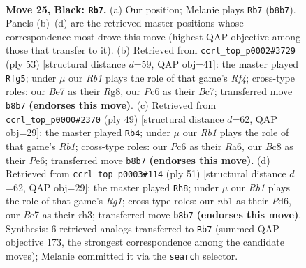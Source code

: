 \documentclass[11pt]{article}
\begin{document}
\clearpage

\begin{figure}[p]\centering
\begin{subfigure}{0.46\textwidth}\centering
\resizebox{\linewidth}{!}{%
\newchessgame
\chessboard[
  setfen={1rb1k3/p1p1bp1r/2p3p1/P1P4p/1P3P1P/2B5/7R/RN2K3 b Q - 6 25},
  showmover=false,
  pgfstyle=straightmove, color=movearrow, markmove={b8-b7}
]}
\caption{}
\end{subfigure}\hfill
\begin{subfigure}{0.46\textwidth}\centering
\resizebox{\linewidth}{!}{%
\newchessgame
\chessboard[
  setfen={2k3r1/1pb2p2/p3pp2/5r2/R1PP3p/2B2P1P/1P4P1/3R1K2 b - - 0 27},
  showmover=false,
  pgfstyle=straightmove, color=movearrow, markmove={f5-g5}
]}
\caption{}
\end{subfigure}
\\[4pt]
\begin{subfigure}{0.46\textwidth}\centering
\resizebox{\linewidth}{!}{%
\newchessgame
\chessboard[
  setfen={1r4k1/5p1p/r1p1p3/4b1P1/p3P3/1P2B3/P1P4P/1K1R3R b - - 3 25},
  showmover=false,
  pgfstyle=straightmove, color=movearrow, markmove={b8-b4}
]}
\caption{}
\end{subfigure}\hfill
\begin{subfigure}{0.46\textwidth}\centering
\resizebox{\linewidth}{!}{%
\newchessgame
\chessboard[
  setfen={4k1r1/4pp2/1r1p1b1p/p2P4/Pp6/5P1R/1PP3P1/1K1R1B2 b - - 0 26},
  showmover=false,
  pgfstyle=straightmove, color=movearrow, markmove={g8-h8}
]}
\caption{}
\end{subfigure}
\caption{\textbf{Move 25, Black: \texttt{Rb7}.} (a) Our position; Melanie plays \texttt{Rb7} (\texttt{b8b7}). Panels (b)--(d) are the retrieved master positions whose correspondence most drove this move (highest QAP objective among those that transfer to it). (b) Retrieved from \texttt{ccrl\_top\_p0002\#3729} (ply 53) [structural distance $d$=59, QAP obj=41]: the master played \texttt{Rfg5}; under $\mu$ our \emph{Rb1} plays the role of that game's \emph{Rf4}; cross-type roles: our \emph{B}e7 as their \emph{R}g8, our \emph{P}c6 as their \emph{B}c7; transferred move \texttt{b8b7} \textbf{(endorses this move)}. (c) Retrieved from \texttt{ccrl\_top\_p0000\#2370} (ply 49) [structural distance $d$=62, QAP obj=29]: the master played \texttt{Rb4}; under $\mu$ our \emph{Rb1} plays the role of that game's \emph{Rb1}; cross-type roles: our \emph{P}c6 as their \emph{R}a6, our \emph{B}c8 as their \emph{P}e6; transferred move \texttt{b8b7} \textbf{(endorses this move)}. (d) Retrieved from \texttt{ccrl\_top\_p0003\#114} (ply 51) [structural distance $d$=62, QAP obj=29]: the master played \texttt{Rh8}; under $\mu$ our \emph{Rb1} plays the role of that game's \emph{Rg1}; cross-type roles: our \emph{n}b1 as their \emph{P}d6, our \emph{B}e7 as their \emph{r}h3; transferred move \texttt{b8b7} \textbf{(endorses this move)}. Synthesis: 6 retrieved analogs transferred to \texttt{Rb7} (summed QAP objective 173, the strongest correspondence among the candidate moves); Melanie committed it via the \texttt{search} selector.}
\label{fig:thought-m49}
\end{figure}
\end{document}
